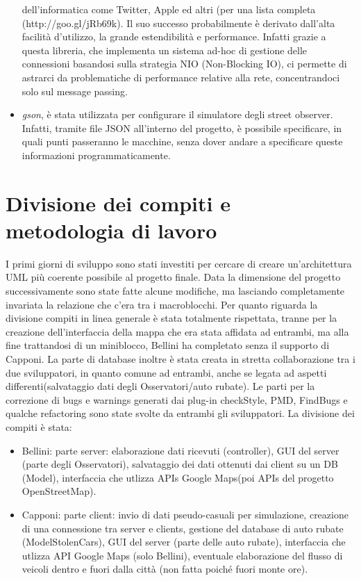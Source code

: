 \documentclass[a4paper,12pt]{report}
\begin{document}
\begin{itemize}
dell'informatica come Twitter, Apple ed altri (per una lista completa 
(http://goo.gl/jRb69k). \newline Il suo successo probabilmente è 
derivato dall'alta facilità d'utilizzo, la grande estendibilità e performance. 
Infatti grazie a questa libreria, che implementa un sistema ad-hoc di gestione 
delle connessioni basandosi sulla strategia NIO (Non-Blocking IO), ci permette 
di astrarci da problematiche di performance relative alla rete, concentrandoci 
solo sul message passing. 
    \item \textit{gson}, è stata utilizzata per configurare il simulatore 
degli street observer. Infatti, tramite file JSON all'interno del progetto, è 
possibile specificare, in quali punti passeranno le macchine, senza dover 
andare a specificare queste informazioni programmaticamente.
  \end{itemize} 

\section{Divisione dei compiti e metodologia di lavoro}

I primi giorni di sviluppo sono stati investiti per cercare di creare 
un'architettura UML più coerente possibile al progetto finale. Data la 
dimensione del progetto successivamente sono state fatte alcune modifiche, ma 
lasciando completamente invariata la relazione che c'era tra i 
macroblocchi.\newline
Per quanto riguarda la divisione compiti in linea generale è stata totalmente 
rispettata, tranne per la creazione dell'interfaccia della mappa che era 
stata affidata ad entrambi, ma alla fine trattandosi di un miniblocco, Bellini 
ha completato senza il supporto di Capponi. La parte di database inoltre è 
stata creata in stretta collaborazione tra i due sviluppatori, in quanto comune 
ad entrambi, anche se legata ad aspetti differenti(salvataggio dati degli 
Osservatori/auto rubate). 
Le parti per la correzione di bugs e warnings generati dai plug-in checkStyle, 
PMD, FindBugs e qualche refactoring sono state svolte da entrambi gli 
sviluppatori.\newline
La divisione dei compiti è stata:
\begin{itemize}
  \item Bellini: parte server: elaborazione dati ricevuti (controller), GUI del 
server (parte degli Osservatori), salvataggio dei dati ottenuti dai client su 
un DB (Model), interfaccia che utlizza APIs Google Maps(poi APIs del progetto 
OpenStreetMap).
  \item Capponi: parte client: invio di dati pseudo-casuali per simulazione, 
creazione di una connessione tra server e clients, gestione del database di 
auto rubate (ModelStolenCars), GUI del server (parte delle auto rubate), 
interfaccia che utlizza API Google Maps (solo Bellini), eventuale elaborazione 
del flusso di veicoli dentro e fuori dalla città (non fatta poiché fuori monte 
ore).
\end{itemize}
\end{document}
